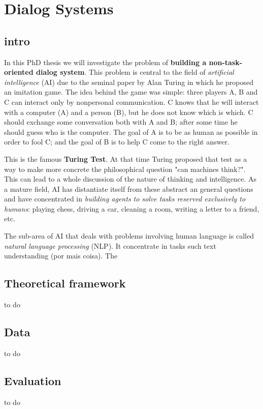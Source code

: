 \chapter{Dialog Systems}\label{dialog}
\section{intro}\label{sec:intro}

In this PhD thesis we will investigate the problem of \textbf{building a non-task-oriented dialog system}. This problem is central to the field of \textit{artificial intelligence} (AI) due to the seminal paper by Alan Turing \cite{Turing} in which he proposed an imitation game. The idea behind the game was simple: three players A, B and C can interact only by nonpersonal communication. C knows that he will interact with a computer (A) and a person (B), but he does not know which is which. C should exchange some conversation both with A and B; after some time he should guess who is the computer. The goal of A is to be as human as possible in order to fool C; and the goal of B is to help C come to the right answer.

\par This is the famous \textbf{Turing Test}. At that time Turing proposed that test as a way to make more concrete the philosophical question "can machines think?". This can lead to a whole discussion of the nature of thinking and intelligence. As a mature field, AI has distantiate itself from these abstract an general questions and have concentrated in \textit{building agents to solve tasks reserved exclusively to humans}: playing chess, driving a car, cleaning a room, writing a letter to a friend, etc.    

\par The sub-area of AI that deals with problems involving human language is called \textit{natural language processing} (NLP). It concentrate in tasks such text understanding (por mais coisa). The 

\section{Theoretical framework}

to do

\section{Data}

to do

\section{Evaluation}

to do